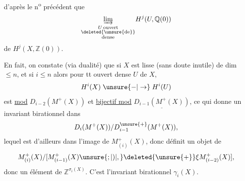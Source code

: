 d'après le n\textsuperscript{o} précédent que  
\[
\underset{\substack{U\,\text{ouvert}\\\deleted{\text{\unsure{de}}}\\\text{dense}}}{\underrightarrow{\lim}}H^j(U,\mathbb Q(0))
\]
de $H^j(X,\mathbb Z(0))$.

En fait, on constate (via dualité) que si $X$ est lisse (sans doute inutile) de dim $\leq n$, et si $i\leq n$ alors pour tt ouvert dense $U$ de $X$,
\[
H^i(X)\mathrel{\unsure{-|\to}}H^i(U)
\]
est \uline{ mod} $D_{i-2}(M^+(X))$ et \uline{bijectif mod} $\underline{D_{i-1}(M^+(X))}$, ce qui donne un invariant birationnel dans
\[
D_{i}(M^+(X))/D^{\unsure{+}}_{i-1}(M^+(X)),
\]
lequel est d'ailleurs dans l'image de $M^+_{(i)}(X)$, donc définit un objet de
\[
M^+_{(i)}(X)/[M^+_{(i-1)}(X)\unsure{;|)|,}\deleted{\unsure{+}}\xi M^+_{(i-2)}(X)],
\]
donc un élément de $\mathbb Z^{\sigma_i(X)}$. C'est l'invariant birationnel $\gamma_i(X)$.
